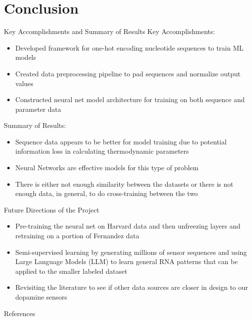 \documentclass[9pt, dvipsnames]{beamer}
\begin{document}
\section{Conclusion}
\begin{frame}{Key Accomplishments and Summary of Results}
    \large
    Key Accomplishments:
    \begin{itemize}
        \item Developed framework for one-hot encoding nucleotide
        sequences to train ML models\pause
        \item Created data preprocessing pipeline to pad sequences
        and normalize output values \pause
        \item Constructed neural net model architecture for training
        on both sequence and parameter data
    \end{itemize}
    Summary of Results:
    \begin{itemize}
        \item Sequence data appears to be better for model training due
        to potential information loss in calculating thermodynamic parameters\pause
        \item Neural Networks are effective models for this type
        of problem \pause
        \item There is either not enough similarity between the datasets or
        there is not enough data, in general, to do cross-training between the two
    \end{itemize}
\end{frame}

\begin{frame}{Future Directions of the Project}
\large
    \begin{itemize}
        \item Pre-training the neural net on Harvard data and then unfreezing layers
        and retraining on a portion of Fernandez data\pause
        \item Semi-supervised learning by generating millions of sensor sequences and
        using Large Language Models (LLM) to learn general RNA patterns that can be
        applied to the smaller labeled dataset\pause
        \item Revisiting the literature to see if other data sources are closer
        in design to our dopamine sensors
    \end{itemize}
\end{frame}

\begin{frame}{References}
    
    
\end{frame}
\end{document}
